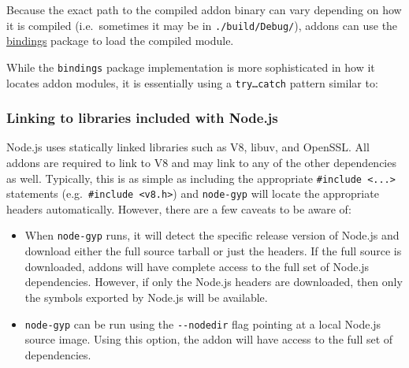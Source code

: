 Because the exact path to the compiled addon binary can vary depending
on how it is compiled (i.e.~sometimes it may be in
\texttt{./build/Debug/}), addons can use the
\href{https://github.com/TooTallNate/node-bindings}{bindings} package to
load the compiled module.

While the \texttt{bindings} package implementation is more sophisticated
in how it locates addon modules, it is essentially using a
\texttt{try…catch} pattern similar to:

\begin{Shaded}
\begin{Highlighting}[]
\NormalTok{ \{}
   \NormalTok{(}\NormalTok{)}\OperatorTok{;}
\NormalTok{\} }
   \NormalTok{(}\NormalTok{)}\OperatorTok{;}
\NormalTok{\}}
\end{Highlighting}
\end{Shaded}

\subsubsection{Linking to libraries included with
Node.js}\label{linking-to-libraries-included-with-node.js}

Node.js uses statically linked libraries such as V8, libuv, and OpenSSL.
All addons are required to link to V8 and may link to any of the other
dependencies as well. Typically, this is as simple as including the
appropriate \texttt{\#include\ \textless{}...\textgreater{}} statements
(e.g.~\texttt{\#include\ \textless{}v8.h\textgreater{}}) and
\texttt{node-gyp} will locate the appropriate headers automatically.
However, there are a few caveats to be aware of:

\begin{itemize}
\item
  When \texttt{node-gyp} runs, it will detect the specific release
  version of Node.js and download either the full source tarball or just
  the headers. If the full source is downloaded, addons will have
  complete access to the full set of Node.js dependencies. However, if
  only the Node.js headers are downloaded, then only the symbols
  exported by Node.js will be available.
\item
  \texttt{node-gyp} can be run using the \texttt{-\/-nodedir} flag
  pointing at a local Node.js source image. Using this option, the addon
  will have access to the full set of dependencies.
\end{itemize}

